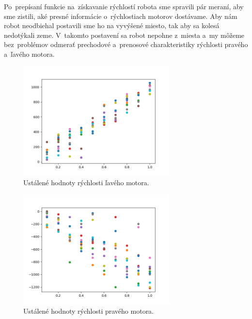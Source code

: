 Po~prepísaní funkcie na~získavanie rýchlostí robota sme spravili pár meraní, aby sme zistili, aké presné informácie o~rýchlostiach
motorov dostávame. Aby nám robot neodbiehal postavili sme ho na vyvýšené miesto, tak aby sa kolesá nedotýkali zeme. V~takomto
postavení sa robot nepohne z~miesta a~my môžeme bez~problémov odmerať prechodové a~prenosové charakteristiky rýchlosti pravého
a~ľavého motora.

\begin{figure}[!htbp]
	\begin{center}
		\includegraphics[width=8cm]{img/Left_wheel.png}
	\end{center}
	\caption{Ustálené hodnoty rýchlosti ľavého motora. }
	\label{fig:laveKoleso}
\end{figure}

\begin{figure}[!htbp]
	\begin{center}
		\includegraphics[width=8cm]{img/Right_wheel.png}
	\end{center}
	\caption{Ustálené hodnoty rýchlosti pravého motora. }
	\label{fig:praveKoleso}
\end{figure}

